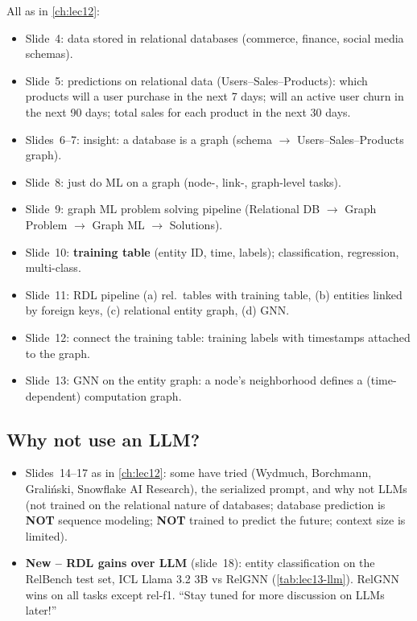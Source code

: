 All as in \cref{ch:lec12}:
\begin{itemize}
  \item Slide~4: data stored in relational databases (commerce, finance, social media
    schemas).
  \item Slide~5: predictions on relational data (Users--Sales--Products): which
    products will a user purchase in the next 7 days; will an active user churn in the
    next 90 days; total sales for each product in the next 30 days.
  \item Slides~6--7: insight: a database is a graph (schema $\to$ Users--Sales--Products
    graph).
  \item Slide~8: just do ML on a graph (node-, link-, graph-level tasks).
  \item Slide~9: graph ML problem solving pipeline (Relational DB $\to$ Graph Problem
    $\to$ Graph ML $\to$ Solutions).
  \item Slide~10: \textbf{training table} (entity ID, time, labels); classification,
    regression, multi-class.
  \item Slide~11: RDL pipeline (a) rel.\ tables with training table, (b) entities linked
    by foreign keys, (c) relational entity graph, (d) GNN.
  \item Slide~12: connect the training table: training labels with timestamps attached
    to the graph.
  \item Slide~13: GNN on the entity graph: a node's neighborhood defines a
    (time-dependent) computation graph.
\end{itemize}

\subsection{Why not use an LLM?}\label{sec:lec13-llm}

\begin{itemize}
  \item Slides~14--17 as in \cref{ch:lec12}: some have tried (Wydmuch, Borchmann,
    Grali\'nski, Snowflake AI Research), the serialized prompt, and why not LLMs (not
    trained on the relational nature of databases; database prediction is \textbf{NOT}
    sequence modeling; \textbf{NOT} trained to predict the future; context size is
    limited).
  \item \textbf{New -- RDL gains over LLM} (slide~18): entity classification on the
    RelBench test set, ICL Llama 3.2 3B vs RelGNN (\cref{tab:lec13-llm}). RelGNN wins on
    all tasks except rel-f1. ``Stay tuned for more discussion on LLMs later!''
\end{itemize}

